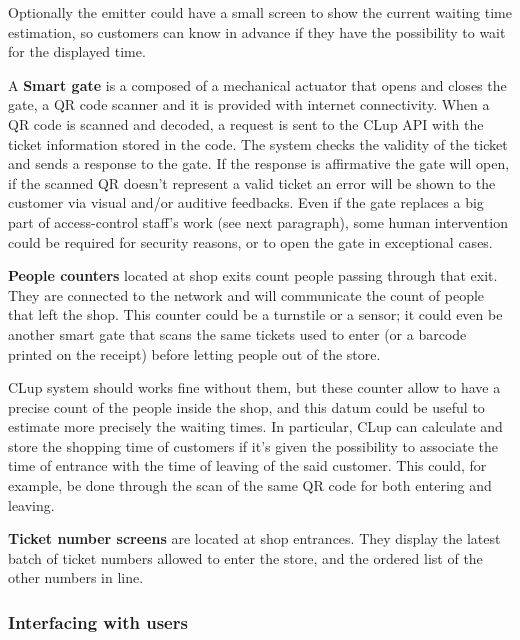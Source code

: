 Optionally the emitter could have a small screen to show the current waiting time estimation, so customers can know in advance if they have the possibility to wait for the displayed time.


A \textbf{Smart gate} is a composed of a mechanical actuator that opens and closes the gate, a QR code scanner and it is provided with internet connectivity. When a QR code is scanned and decoded, a request is sent to the CLup API with the ticket information stored in the code.
The system checks the validity of the ticket and sends a response to the gate. If the response is affirmative the gate will open, if the scanned QR doesn't represent a valid ticket an error will be shown to the customer via visual and/or auditive feedbacks. Even if the gate replaces a big part of access-control staff's work (see next paragraph), some human intervention could be required for security reasons, or to open the gate in exceptional cases.


\textbf{People counters} located at shop exits count people passing through that exit. They are connected to the network and will communicate the count of people that left the shop. This counter could be a turnstile or a sensor; it could even be another smart gate that scans the same tickets used to enter (or a barcode printed on the receipt) before letting people out of the store.

CLup system should works fine without them, but these counter allow to have a precise count of the people inside the shop, and this datum could be useful to estimate more precisely the waiting times. In particular, CLup can calculate and store the shopping time of customers if it's given the possibility to associate the time of entrance with the time of leaving of the said customer. This could, for example, be done through the scan of the same QR code for both entering and leaving.


\textbf{Ticket number screens} are located at shop entrances. They display the latest batch of ticket numbers allowed to enter the store, and the ordered list of the other numbers in line.

\vfill
\pagebreak

\subsubsection{Interfacing with users}

